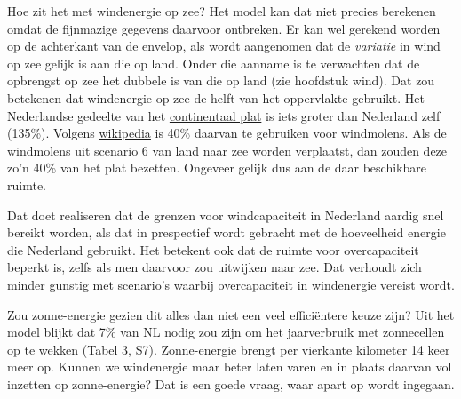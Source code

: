 \documentclass[
  11pt,
  a4paper,
]{book}
\begin{document}
Hoe zit het met windenergie op zee? Het model kan dat niet precies berekenen omdat de fijnmazige gegevens daarvoor ontbreken. Er kan wel gerekend worden op de achterkant van de envelop, als wordt aangenomen dat de \emph{variatie} in wind op zee gelijk is aan die op land. Onder die aanname is te verwachten dat de opbrengst op zee het dubbele is van die op land (zie hoofdstuk wind). Dat zou betekenen dat windenergie op zee de helft van het oppervlakte gebruikt. Het Nederlandse gedeelte van het \href{https://nl.wikipedia.org/wiki/Nederlandse_Exclusieve_Economische_Zone}{continentaal plat} is iets groter dan Nederland zelf (135\%). Volgens \href{https://nl.wikipedia.org/wiki/Windturbines_in_Nederland}{wikipedia} is 40\% daarvan te gebruiken voor windmolens. Als de windmolens uit scenario 6 van land naar zee worden verplaatst, dan zouden deze zo'n 40\% van het plat bezetten. Ongeveer gelijk dus aan de daar beschikbare ruimte.

Dat doet realiseren dat de grenzen voor windcapaciteit in Nederland aardig snel bereikt worden, als dat in prespectief wordt gebracht met de hoeveelheid energie die Nederland gebruikt. Het betekent ook dat de ruimte voor overcapaciteit beperkt is, zelfs als men daarvoor zou uitwijken naar zee. Dat verhoudt zich minder gunstig met scenario's waarbij overcapaciteit in windenergie vereist wordt.

Zou zonne-energie gezien dit alles dan niet een veel efficiëntere keuze zijn? Uit het model blijkt dat 7\% van NL nodig zou zijn om het jaarverbruik met zonnecellen op te wekken (Tabel 3, S7). Zonne-energie brengt per vierkante kilometer 14 keer meer op. Kunnen we windenergie maar beter laten varen en in plaats daarvan vol inzetten op zonne-energie? Dat is een goede vraag, waar apart op wordt ingegaan.
\end{document}
